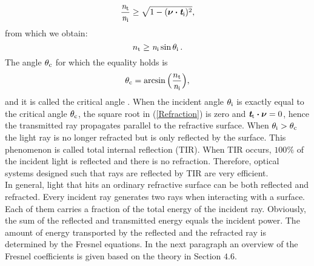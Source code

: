 \begin{equation}
\frac{\textit{n}_\textrm{t}}{\textit{n}_\textrm{i}}\geq \sqrt{1-(\boldsymbol{\nu}\boldsymbol{\cdot}\textit{\textbf{t}}_\textrm{i})^2},
\end{equation}
from which we obtain:
\begin{equation}
 n_\textrm{t}\geq \textit{n}_\textrm{i} \sin\theta_\textrm{i}\,.
\end{equation}
 The angle $\theta_{\textrm{c}}$ for which the equality holds is
\begin{equation}\label{critical}
\theta_{\textrm{c}} = \arcsin\Big(\frac{n_\textrm{t}}{\textit{n}_\textrm{i}}\Big),
\end{equation} and it is called the critical angle \cite{chaves2015introduction}.
When the incident angle $\theta_{\textrm{i}}$ is exactly equal to the critical angle $\theta_{\textrm{c}}$, the square root in (\ref{Refraction}) is zero and $\textit{\textbf{t}}_\textrm{t}\boldsymbol{\cdot}\boldsymbol{\nu}=0$, hence the transmitted ray propagates parallel to the refractive surface. 
When $\theta_{\textrm{i}}>\theta_{\textrm{c}}$ the light ray is no longer refracted but is only reflected by the surface. This phenomenon is called total internal reflection (TIR). When TIR occurs, $100\%$ of the incident light is reflected and there is no refraction. Therefore, optical systems designed such that rays are reflected by TIR are very efficient. \\ \indent 
In general, light that hits an ordinary refractive surface can be both reflected and refracted. Every incident ray generates two rays when interacting with a surface. Each of them carries a fraction of the total energy of the incident ray. Obviously, the sum of the reflected and transmitted energy equals the incident power.
The amount of energy transported by the reflected and the refracted ray is determined by the Fresnel equations. In the next paragraph an overview of the Fresnel coefficients is given based on the theory in \cite{hecht1998hecht} Section $4.6$.
